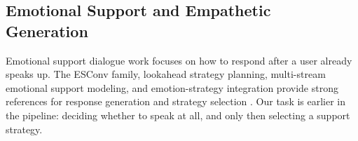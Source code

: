 \subsection{Emotional Support and Empathetic Generation}
Emotional support dialogue work focuses on how to respond after a user already speaks up. The ESConv family, lookahead strategy planning, multi-stream emotional support modeling, and emotion-strategy integration provide strong references for response generation and strategy selection \cite{esc2021,lookahead2022,mffesc2024,emstremo2024,empdg2020,mime2020,avamerg2025}. Our task is earlier in the pipeline: deciding whether to speak at all, and only then selecting a support strategy.

